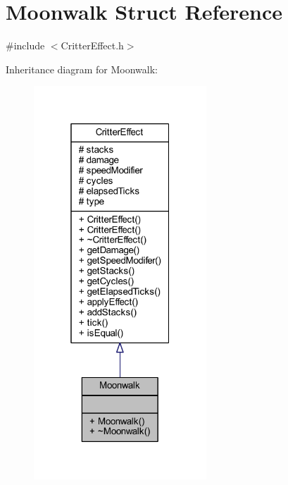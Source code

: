 \hypertarget{struct_moonwalk}{\section{Moonwalk Struct Reference}
\label{struct_moonwalk}
}


{\ttfamily \#include $<$Critter\+Effect.\+h$>$}



Inheritance diagram for Moonwalk\+:\nopagebreak
\begin{figure}[H]
\begin{center}
\leavevmode
\includegraphics[width=184pt]{struct_moonwalk__inherit__graph}
\end{center}
\end{figure}


